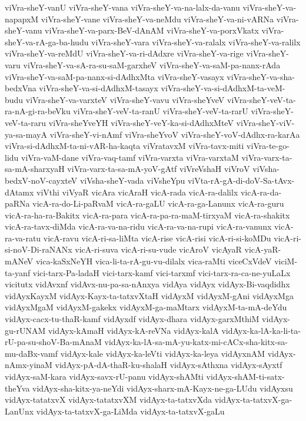 {viVra-sheY-vanU
viVra-sheY-vana
viVra-sheY-va-na-lalx-da-vanu
viVra-sheY-va-napapxM
viVra-sheY-vane
viVra-sheY-va-neMdu
viVra-sheY-va-ni-vARNa
viVra-sheY-vanu
viVra-sheY-va-parx-BeV-dAnAM
viVra-sheY-va-porxVkatx
viVra-sheY-va-rA-ga-ba-hudu
viVra-sheY-vara
viVra-sheY-va-ralalx
viVra-sheY-va-ralilx
viVra-sheY-va-reMdU
viVra-sheY-va-ri-dAdxre
viVra-sheY-va-rige
viVra-sheY-varu
viVra-sheY-va-sA-ra-su-saM-garxheV
viVra-sheY-va-saM-pa-nanx-rAda
viVra-sheY-va-saM-pa-nanx-si-dAdhxMta
viVra-sheY-vasayx
viVra-sheY-va-sha-bedxVna
viVra-sheY-va-si-dAdhxM-tasayx
viVra-sheY-va-si-dAdhxM-ta-veM-budu
viVra-sheY-va-varxteV
viVra-sheY-vavu
viVra-sheYveV
viVra-sheY-veV-ta-ra-nA-gi-ra-beVku
viVra-sheY-veV-ta-ranU
viVra-sheY-veV-ta-rarU
viVra-sheY-veV-ta-raru
viVra-sheYveYH
viVra-sheY-veY-ka-si-dAdhxMteV
viVra-sheY-viV-ya-sa-mayA
viVra-sheY-vi-nAmf
viVra-sheYvoV
viVra-sheY-voV-dAdhx-ra-karAa
viVra-si-dAdhxM-ta-ni-vAR-ha-kaqta
viVratavxM
viVra-tavx-miti
viVra-te-go-lidu
viVra-vaM-dane
viVra-vaq-tamf
viVra-varxta
viVra-varxtaM
viVra-varx-ta-sa-mA-sharxyaH
viVra-varx-ta-sa-mA-yoV-gAtf
viVreVshaH
viVroV
viVsha-bedxV-noV-cayxteV
viVsha-sheY-vada
viVsheYpu
viVta-rA-gA-di-doV-Sa-tAvx-dAtamx
viVthi
viVyaR
vicAra
vicAraH
vicA-rada
vicA-ra-dalilx
vicA-ra-da-paRNa
vicA-ra-do-Li-paRvaM
vicA-ra-gaLU
vicA-ra-ga-Lanunx
vicA-ra-guru
vicA-ra-ha-ra-Bakitx
vicA-ra-para
vicA-ra-pa-ra-maM-tirxyaM
vicA-ra-shakitx
vicA-ra-tavx-diMda
vicA-ra-va-na-ridu
vicA-ra-va-na-rupi
vicA-ra-vanunx
vicA-ra-va-ratu
vicA-ravu
vicA-ri-sa-liMta
vicA-rise
vicA-risi
vicA-ri-si-koMDu
vicA-ri-si-noV-Di-raNANx
vicA-ri-suva
vicA-ri-su-vude
vicAroV
vicAyaR
vicA-yaR-mANeV
vica-kaSxNeYH
vica-li-ta-rA-gu-vu-dilalx
vica-raMti
viceCxVdeV
viciM-ta-yanf
vici-tarx-Pa-ladaH
vici-tarx-kamf
vici-tarxmf
vici-tarx-ra-ca-ne-yuLaLx
vicitutx
vidAvxnf
vidAvx-nu-pa-sa-nAnxya
vidAya
vidAyx
vidAyx-Bi-vaqdidhx
vidAyxKayxM
vidAyx-Kayx-ta-tatxvXtaH
vidAyxM
vidAyxM-gAni
vidAyxMga
vidAyxMgaM
vidAyxM-gakekx
vidAyxM-ga-maMtarx
vidAyxM-ta-mA-deYdu
vidAyx-cacx-tu-thaR-kamf
vidAyxdf
vidAyx-dhara
vidAyx-garxMthiM
vidAyx-gu-rUNAM
vidAyx-kAmaH
vidAyx-kA-reVNa
vidAyx-kalA
vidAyx-ka-lA-ka-li-ta-rU-pa-su-shoV-Ba-mAnaM
vidAyx-ka-lA-sa-mA-yu-katx-mi-cACx-sha-kitx-sa-mu-daBx-vamf
vidAyx-kale
vidAyx-ka-leVti
vidAyx-ka-leya
vidAyxnAM
vidAyx-nAmx-yinaM
vidAyx-pA-dA-thaR-ku-shalaH
vidAyx-sAthxna
vidAyx-sAyxtf
vidAyx-saM-kara
vidAyx-savx-rU-panu
vidAyx-shAMti
vidAyx-shAM-ti-satx-theYva
vidAyx-sha-kitx-ya-neYdi
vidAyx-sharx-mA-Kayx-ne-ga-LUdu
vidAyxsu
vidAyx-tatatxvX
vidAyx-tatatxvXM
vidAyx-ta-tatxvXda
vidAyx-ta-tatxvX-ga-LanUnx
vidAyx-ta-tatxvX-ga-LiMda
vidAyx-ta-tatxvX-gaLu
}
